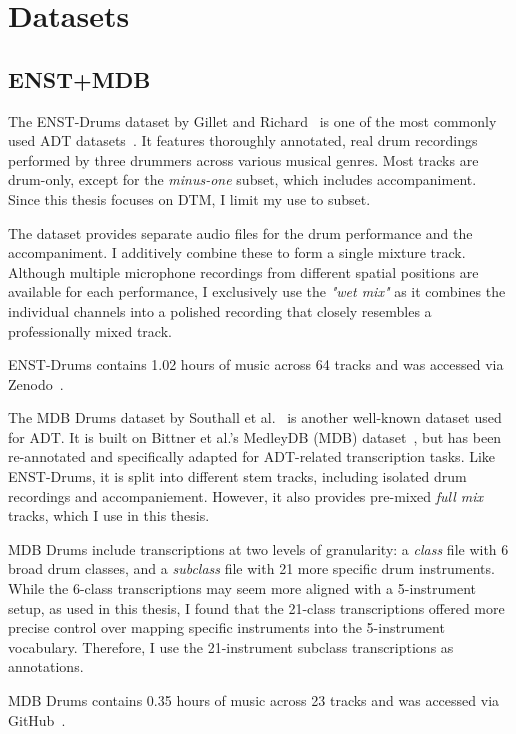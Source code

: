 \chapter{Datasets}\label{Datasets}

\section{ENST+MDB}

The ENST-Drums dataset by Gillet and Richard~\cite{gillet2006enst} is one of the most commonly used \gls{ADT} datasets~\cite{8350302}. It features thoroughly annotated, real drum recordings performed by three drummers across various musical genres. Most tracks are drum-only, except for the \textit{minus-one} subset, which includes accompaniment. Since this thesis focuses on \gls{DTM}, I limit my use to subset.

The dataset provides separate audio files for the drum performance and the accompaniment. I additively combine these to form a single mixture track. Although multiple microphone recordings from different spatial positions are available for each performance, I exclusively use the \textit{"wet mix"} as it combines the individual channels into a polished recording that closely resembles a professionally mixed track.

ENST-Drums contains 1.02 hours of music across 64 tracks and was accessed via Zenodo~\cite{gillet_2006_7432188}.

The MDB Drums dataset by Southall et al.~\cite{southall2017mdb} is another well-known dataset used for \gls{ADT}. It is built on Bittner et al.'s MedleyDB (MDB) dataset~\cite{bittner2014medleydb}, but has been re-annotated and specifically adapted for \gls{ADT}-related transcription tasks. Like ENST-Drums, it is split into different stem tracks, including isolated drum recordings and accompaniement. However, it also provides pre-mixed \textit{full mix} tracks, which I use in this thesis.

MDB Drums include transcriptions at two levels of granularity: a \textit{class} file with 6 broad drum classes, and a \textit{subclass} file with 21 more specific drum instruments. While the 6-class transcriptions may seem more aligned with a 5-instrument setup, as used in this thesis, I found that the 21-class transcriptions offered more precise control over mapping specific instruments into the 5-instrument vocabulary. Therefore, I use the 21-instrument subclass transcriptions as annotations.

MDB Drums contains 0.35 hours of music across 23 tracks and was accessed via GitHub~\cite{southall_mdbdrums_2017}.


